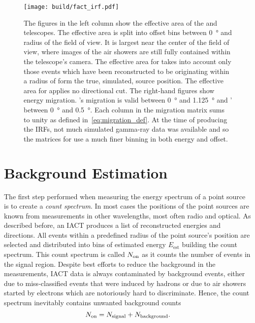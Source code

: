 \begin{figure}[]
  \centering
  \texttt{[image: build/fact\_irf.pdf]}
  \caption[Instrument response function for \hess and \fact]{The figures in the left column show the effective area of the \fact and \hess telescopes.
  The effective area is split into offset bins between \SI{0}{\degree} and radius of the field of view.
  It is largest near the center of the field of view, where images of the 
  air showers are still fully contained within the telescope's camera. 
  The effective area for \fact takes into account only those events which have been
  reconstructed to be originating within a radius of \protect{}
  form the true, simulated, source position.
  The effective area for \hess applies no directional cut.
  The right-hand figures show energy migration. 
  \fact's migration is valid between \SI{0}{\degree} and \SI{1.125}{\degree} and \hess'  between  \SI{0}{\degree} and \SI{0.5}{\degree}.
  Each column in the migration matrix sums to unity as defined in~\eqref{eq:migration_def}.
  At the time of producing the \fact IRFs, not much simulated gamma-ray data was available and so
  the matrices for \hess use a much finer binning in both energy and offset.
  }
  \label{fig:fact_irf}
\end{figure}


\section{Background Estimation}
\label{sec:bg_estimates}
The first step performed when measuring the energy spectrum of a point source is to create a \emph{count spectrum}.
In most cases the positions of the point sources are known from measurements in other wavelengths, most often radio and optical.
As described before, an IACT produces a list of reconstructed energies and directions. 
All events within a predefined radius of the point source's position are selected and distributed into bins of estimated energy $E_\text{est}$ building the count spectrum.
This count spectrum is called $N_\text{on}$ as it counts the number of events in the signal region.
Despite best efforts to reduce the background in the measurements, IACT data is always contaminated by background events, either due to miss-classified events 
that were induced by hadrons or due to air showers started by electrons which are notoriously hard to discriminate. 
Hence, the count spectrum inevitably contains unwanted background counts
\begin{equation*}
  N_\text{on} =  N_{\text{signal}} + N_{\text{background}}.
\end{equation*}

